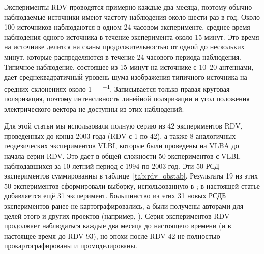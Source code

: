 Эксперименты RDV проводятся примерно каждые два месяца, поэтому обычно наблюдаемые источники
имеют частоту наблюдения около шести раз в год. Около 100 источников наблюдаются в одном 24-часовом
эксперименте, среднее время наблюдения одного источника в течение эксперимента около 15 минут. Это
время на источнике делится на сканы продолжительностью от одной до нескольких минут, которые
распределяются в течение 24-часового периода наблюдения. Типичное наблюдение, состоящее из 15 минут
на источнике с 10--20 антеннами, дает среднеквадратичный уровень шума изображения типичного
источника на средних склонениях около \SI{1}{\milli\jansky\per\beam}. Записывается только правая
круговая поляризация, поэтому интенсивность линейной поляризации и угол положения электрического
вектора не доступны из этих наблюдений.

Для этой статьи мы использовали полную серию из 42 экспериментов RDV, проведенных до конца 2003 года
(RDV с 1 по 42), а также 8 аналогичных геодезических экспериментов VLBI, которые были проведены на
VLBA до начала серии RDV. Это дает в общей сложности 50 экспериментов с VLBI, наблюдавшихся за
10-летний период с 1994 по 2003 год. Эти 50 РСД экспериментов суммированны в
таблице~\ref{tab:rdv_obstab}. Результаты 19 из этих 50 экспериментов сформировали выборку,
использованную в \cite{Piner_2007}; в настоящей статье добавляется ещё 31 эксперимент. Большинство
из этих 31 новых РСДБ экспериментов ранее не картографировались, а были получены авторами для целей
этого и других проектов (например, \cite{Pushkarev_Kovalev_2012}). Серия экспериментов RDV
продолжает наблюдаться каждые два месяца до настоящего времени (и в настоящее время до RDV 93), но
эпохи после RDV 42 не полностью прокартографированы и промоделированы.

